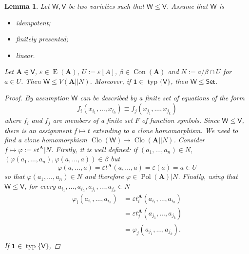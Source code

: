 \documentclass{amsart}
\theoremstyle{plain}
\newtheorem{lemma}[theorem]{Lemma}
\theoremstyle{definition}
\theoremstyle{remark}
\def\phi{\varphi}
\def\epsilon{\varepsilon}
\DeclareMathOperator{\Clo}{Clo}
\DeclareMathOperator{\Con}{Con}
\DeclareMathOperator{\Pol}{Pol}
\DeclareMathOperator{\typ}{typ}
\DeclareMathOperator{\Id}{E}
\begin{document}
\begin{lemma}
    Let $\mathsf{W}, \mathsf{V}$ be two varieties such that $\mathsf{W} \le \mathsf{V}$. 
    Assume that $\mathsf{W}$ is 
    \begin{itemize}
        \item idempotent; 
        \item finitely presented; 
        \item linear. 
    \end{itemize}
    Let $\mathbf{A} \in \mathsf{V}$, $\epsilon \in \Id(\mathbf{A})$, $U:=\epsilon[A]$, $\beta \in \Con(\mathbf{A})$ and $N:=a/\beta \cap U$ for $a \in U$. 
    Then $\mathsf{W} \le V(\mathbf{A}||N)$. 
    Moreover, if $\mathbf{1} \in \typ\{\mathsf{V}\}$, then $\mathsf{W} \le \mathsf{Set}$. 
    \begin{proof}
        By assumption $\mathsf{W}$ can be described by a finite set of equations of the form 
        \begin{equation}
            f_i(x_{i_1}, \ldots, x_{i_h}) \equiv f_j(x_{j_1}, \ldots, x_{j_k})
        \end{equation}
        where $f_i$ and $f_j$ are members of a finite set $F$ of function symbols. 
        Since $\mathsf{W} \le  \mathsf{V}$, there is an assignment $f \mapsto t$ extending to a clone homomorphism. 
        We need to find a clone homomorphism $\Clo(\mathsf{W}) \to \Clo(\mathbf{A}||N)$. 
        Consider $f \mapsto \phi:=\epsilon t^\mathbf{A} |N$. 
        Firstly, it is well defined: if $(a_1, \ldots, a_n) \in N$, $(\phi(a_1, \ldots, a_n), \phi(a, \ldots, a)) \in \beta$ but 
        \begin{equation*}
            \phi(a, \ldots, a) = \epsilon t^\mathbf{A} (a, \ldots, a) = \epsilon(a)=a \in U
        \end{equation*}
        so that $\phi(a_1, \ldots, a_n) \in N$ and therefore $\phi \in \Pol(\mathbf{A})|N$. 
        Finally, using that $\mathsf{W} \le  \mathsf{V}$, for every $a_{i_1}, \ldots, a_{i_h},a_{j_1}, \ldots, a_{j_k} \in N$
        \begin{align*}
            \phi_i(a_{i_1}, \ldots, a_{i_h}) & = \epsilon t_i^\mathbf{A} (a_{i_1}, \ldots, a_{i_h}) \\
            & = \epsilon t_j^\mathbf{A} (a_{j_1}, \ldots, a_{j_k})\\
            & = \phi_j(a_{j_1}, \ldots, a_{j_k}) \text{.} \\
        \end{align*} 
        If $\mathbf{1} \in \typ\{\mathsf{V}\}$, 

\end{proof}
\end{lemma}
\end{document}
